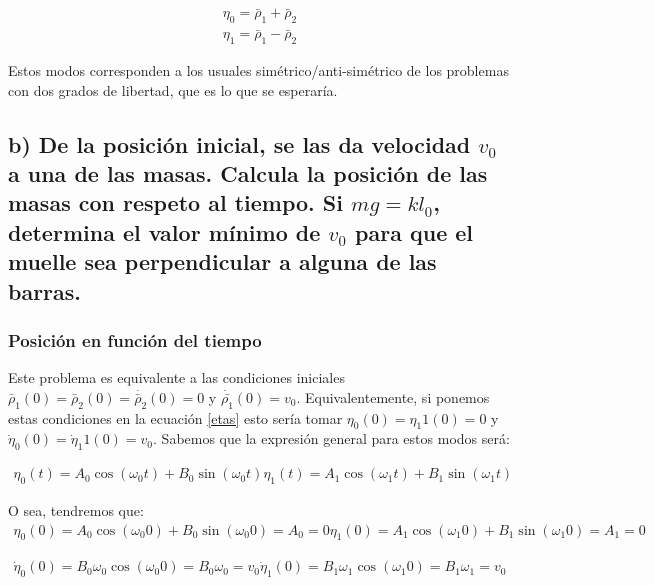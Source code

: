 \documentclass[a4paper,12pt]{article}
\begin{document}
\begin{equation}
  \begin{aligned}
  \label{etas}
  \eta_0 = \bar{\rho}_1 + \bar{\rho}_2\\
  \eta_1 = \bar{\rho}_1 - \bar{\rho}_2
  \end{aligned}
\end{equation}

Estos modos corresponden a los usuales simétrico/anti-simétrico de los problemas con dos grados de libertad, que es lo  que se esperaría. 
\subsection*{b) De la posición inicial, se las da velocidad $v_0$ a una de las masas. Calcula la posición de las masas con respeto al tiempo. Si $mg = kl_0$, determina el valor mínimo de $v_0$ para que el muelle sea perpendicular a alguna de las barras.}

\subsubsection*{Posición en función del tiempo}

Este problema es equivalente a las condiciones iniciales $\bar{\rho}_{1}(0) =\bar{\rho}_{2}(0) = \dot{\bar{\rho}_{2}}(0) = 0$ y $\dot{\bar{\rho_1}}(0) = v_{0}$. Equivalentemente, si ponemos estas condiciones en la ecuación \eqref{etas} esto sería tomar $\eta_{0}(0) = \eta_1{1}(0) = 0$ y $\dot{\eta}_{0}(0) = \dot{\eta}_1{1}(0) = v_0$. Sabemos que la expresión general para estos modos será:

\begin{equation*}
  \begin{aligned}
  \eta_0 (t)= A_0 \cos(\omega_0 t) + B_0 \sin(\omega_0 t)
  \eta_1 (t) = A_1 \cos(\omega_1 t) + B_1 \sin(\omega_1 t)
  \end{aligned}
\end{equation*}

O sea, tendremos que:
\begin{equation*}
  \begin{aligned}
  \eta_0 (0)= A_0 \cos(\omega_0 0) + B_0 \sin(\omega_0 0) = A_0 = 0
  \eta_1 (0) = A_1 \cos(\omega_1 0) + B_1 \sin(\omega_1 0) = A_1 = 0
  \end{aligned}
\end{equation*}

\begin{equation*}
  \begin{aligned}
  \dot{\eta}_0 (0)= B_0 \omega_0\cos(\omega_0 0) = B_0 \omega_0 = v_0
  \dot{\eta}_1 (0) = B_1\omega_1 \cos(\omega_1 0) = B_1\omega_1 = v_0
  \end{aligned}
\end{equation*}
\end{document}
